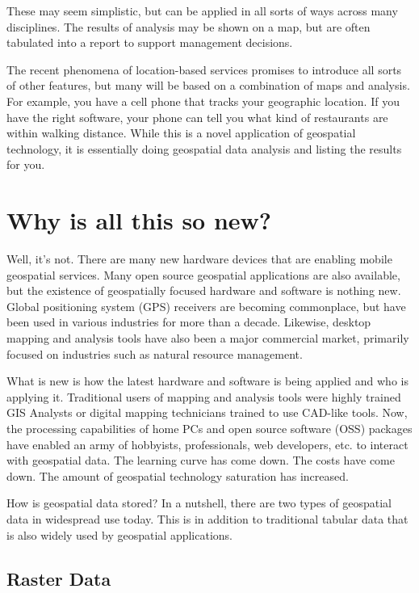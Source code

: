 These may seem simplistic, but can be applied in all sorts of ways across
many disciplines. The results of analysis may be shown on a map, but are
often tabulated into a report to support management decisions.

The recent phenomena of location-based services promises to introduce all
sorts of other features, but many will be based on a combination of maps
and analysis. For example, you have a cell phone that tracks your
geographic location. If you have the right software, your phone can tell
you what kind of restaurants are within walking distance. While this is a
novel application of geospatial technology, it is essentially doing
geospatial data analysis and listing the results for you.

\section{Why is all this so new?}\label{label_whynew}

Well, it's not. There are many new hardware devices that are enabling
mobile geospatial services. Many open source geospatial applications are
also available, but the existence of geospatially focused hardware and
software is nothing new. Global positioning system (GPS) receivers are
becoming commonplace, but have been used in various industries for more
than a decade. Likewise, desktop mapping and analysis tools have also been
a major commercial market, primarily focused on industries such as natural
resource management.

What is new is how the latest hardware and software is being applied and
who is applying it. Traditional users of mapping and analysis tools were
highly trained GIS Analysts or digital mapping technicians trained to use
CAD-like tools. Now, the processing capabilities of home PCs and open
source software (OSS) packages have enabled an army of hobbyists, professionals,
web developers, etc. to interact with geospatial data. The learning curve
has come down. The costs have come down. The amount of geospatial
technology saturation has increased.

How is geospatial data stored? In a nutshell, there are two types of
geospatial data in widespread use today. This is in addition to
traditional tabular data that is also widely used by geospatial
applications.

\subsection{Raster Data}\label{label_rasterdata}

